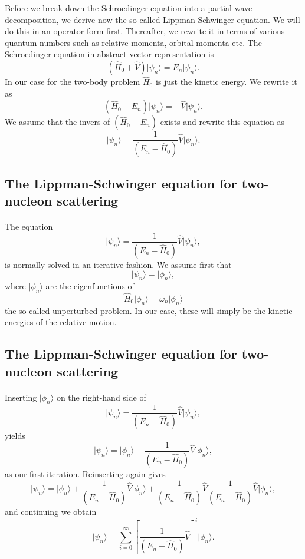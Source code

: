 \documentclass[%
twoside,                 %
final,                   %
10pt]{article}
\begin{document}
Before we break down the Schroedinger equation into a partial wave decomposition, we derive now the so-called Lippman-Schwinger equation. We will do this in an operator form first.
Thereafter, we rewrite it in terms of various quantum numbers such as relative momenta, orbital momenta etc. 
The Schroedinger equation in abstract vector representation is
\[
  \left( \hat{H}_0 + \hat{V} \right) \vert \psi_n \rangle = E_n \vert\psi_n \rangle. 
\]
In our case for the two-body problem $\hat{H}_0$ is just the kinetic energy. 
We rewrite it as 
\[
\left( \hat{H}_0 -E_n \right)\vert\psi_n \rangle =-\hat{V}\vert \psi_n \rangle . 
\]
We assume that the invers of $\left( \hat{H}_0 -E_n\right)$ exists and rewrite this equation as
\[
\vert\psi_n \rangle =\frac{1}{\left( E_n -\hat{H}_0\right)}\hat{V}\vert \psi_n \rangle . 
\]



\subsection*{The Lippman-Schwinger equation for two-nucleon scattering}

\paragraph{}
The equation
\[
\vert \psi_n \rangle =\frac{1}{\left( E_n -\hat{H}_0\right)}\hat{V}\vert \psi_n \rangle,
\]
is normally solved in an iterative fashion. 
We assume first that
\[
\vert\psi_n \rangle = \vert\phi_n \rangle,
\] 
where $\vert\phi_n \rangle$ are the eigenfunctions of 
\[
\hat{H}_0\vert \phi_n \rangle=\omega_n\vert \phi_n \rangle
\]
the so-called unperturbed problem. In our case, these will simply be the kinetic energies of the relative motion.



\subsection*{The Lippman-Schwinger equation for two-nucleon scattering}

\paragraph{}
Inserting  $\vert\phi_n \rangle$  on the right-hand side of 
\[
\vert \psi_n \rangle =\frac{1}{( E_n -\hat{H}_0)}\hat{V}\vert \psi_n \rangle,
\]
yields
\[
\vert \psi_n \rangle =\vert\phi_n \rangle+\frac{1}{\left( E_n -\hat{H}_0\right)}\hat{V}\vert \phi_n \rangle,
\]
as our first iteration. 
Reinserting again gives
\[
\vert \psi_n \rangle =\vert\phi_n \rangle+\frac{1}{\left( E_n -\hat{H}_0\right)}\hat{V}\vert \phi_n \rangle+\frac{1}{( E_n -\hat{H}_0)}\hat{V}\frac{1}{\left( E_n -\hat{H}_0\right)}\hat{V}\vert \phi_n \rangle,
\]
and continuing we obtain
\[
\vert \psi_n \rangle =\sum_{i=0}^{\infty}\left[\frac{1}{( E_n -\hat{H}_0)}\hat{V}\right]^i\vert \phi_n \rangle.
\]
\end{document}
